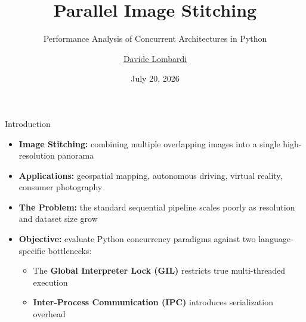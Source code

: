 \documentclass{beamer}
\title{Parallel Image Stitching}
\subtitle{Performance Analysis of Concurrent Architectures in Python}
\author{\href{mailto:davide.lombardi2@edu.unifi.it}{Davide Lombardi}}
\date{July 20, 2026}
\begin{document}
\maketitle

\begin{frame}{Introduction}
  \begin{itemize}
    \item \textbf{Image Stitching:} combining multiple overlapping images into a single high-resolution panorama
    \item \textbf{Applications:} geospatial mapping, autonomous driving, virtual reality, consumer photography
    \item \textbf{The Problem:} the standard sequential pipeline scales poorly as resolution and dataset size grow
    \item \textbf{Objective:} evaluate Python concurrency paradigms against two language-specific bottlenecks:
      \begin{itemize}
        \item The \textbf{Global Interpreter Lock (GIL)} restricts true multi-threaded execution
        \item \textbf{Inter-Process Communication (IPC)} introduces serialization overhead
      \end{itemize}
  \end{itemize}
\end{frame}
\end{document}
